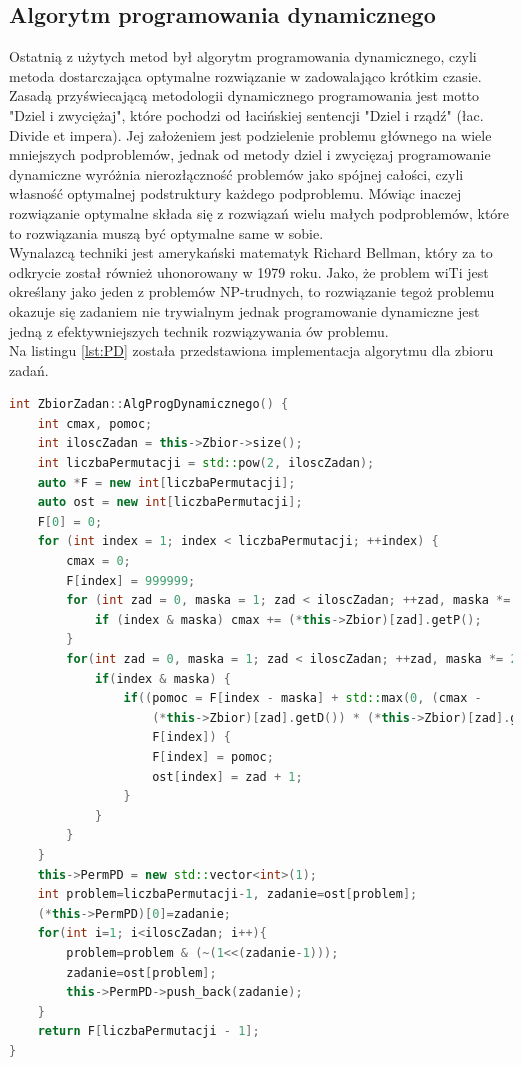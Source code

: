 \documentclass[a4paper]{article}
\begin{document}
\subsection{Algorytm programowania dynamicznego}
Ostatnią z użytych metod był algorytm programowania dynamicznego, czyli metoda dostarczająca optymalne rozwiązanie w zadowalająco krótkim czasie. Zasadą przyświecającą metodologii dynamicznego programowania jest motto "Dziel i zwyciężaj", które pochodzi od łacińskiej sentencji "Dziel i rządź" (łac. Divide et impera). Jej założeniem jest podzielenie problemu głównego na wiele mniejszych podproblemów, jednak od metody dziel i zwycięzaj programowanie dynamiczne wyróżnia nierozłączność problemów jako spójnej całości, czyli własność optymalnej podstruktury każdego podproblemu. Mówiąc inaczej rozwiązanie optymalne składa się z rozwiązań wielu małych podproblemów, które to rozwiązania muszą być optymalne same w sobie. 
\\
Wynalazcą techniki jest amerykański matematyk Richard Bellman, który za to odkrycie został również uhonorowany w 1979 roku.
Jako, że problem wiTi jest określany jako jeden z problemów NP-trudnych, to rozwiązanie tegoż problemu okazuje się zadaniem nie trywialnym jednak programowanie dynamiczne jest jedną z efektywniejszych technik rozwiązywania ów problemu.
\\
Na listingu \ref{lst:PD} została przedstawiona implementacja algorytmu dla zbioru zadań.

\begin{lstlisting}[firstline = 3,label={lst:PD},caption={Algorytm Programowania Dynamicznego},language=C++]
int ZbiorZadan::AlgProgDynamicznego() {
    int cmax, pomoc;
    int iloscZadan = this->Zbior->size();
    int liczbaPermutacji = std::pow(2, iloscZadan);
    auto *F = new int[liczbaPermutacji];
    auto ost = new int[liczbaPermutacji];
    F[0] = 0;
    for (int index = 1; index < liczbaPermutacji; ++index) {
        cmax = 0;
        F[index] = 999999;
        for (int zad = 0, maska = 1; zad < iloscZadan; ++zad, maska *= 2) {
            if (index & maska) cmax += (*this->Zbior)[zad].getP();
        }
        for(int zad = 0, maska = 1; zad < iloscZadan; ++zad, maska *= 2) {
            if(index & maska) {
                if((pomoc = F[index - maska] + std::max(0, (cmax - 
                    (*this->Zbior)[zad].getD()) * (*this->Zbior)[zad].getW())) <
                    F[index]) {
                    F[index] = pomoc;
                    ost[index] = zad + 1;
                }
            }
        }
    }
    this->PermPD = new std::vector<int>(1);
    int problem=liczbaPermutacji-1, zadanie=ost[problem];
    (*this->PermPD)[0]=zadanie;
    for(int i=1; i<iloscZadan; i++){
        problem=problem & (~(1<<(zadanie-1)));
        zadanie=ost[problem];
        this->PermPD->push_back(zadanie);
    }
    return F[liczbaPermutacji - 1];
} 
\end{lstlisting}
\end{document}
